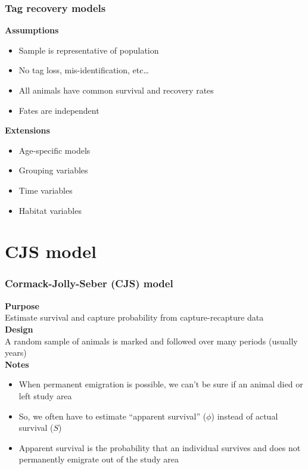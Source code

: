 \documentclass[color=usenames,dvipsnames]{beamer}\usepackage[]{graphicx}\usepackage[]{color}
\begin{document}
\begin{frame}
  \frametitle{Tag recovery models}
  \large
  {\bf Assumptions}
  \begin{itemize}
    \item Sample is representative of population
    \item No tag loss, mis-identification, etc\dots
    \item All animals have common survival and recovery rates
    \item Fates are independent
  \end{itemize}
  \pause
  \vspace{0.5cm}
  {\bf Extensions}
  \begin{itemize}
    \item Age-specific models
    \item Grouping variables
    \item Time variables
    \item Habitat variables
  \end{itemize}
\end{frame}




\section{CJS model}

\begin{frame}
  \frametitle{Cormack-Jolly-Seber (CJS) model}
  {\bf Purpose} \\
  Estimate survival and capture probability from capture-recapture data \\
  \pause
  \vspace{0.5cm}
  {\bf Design} \\
  A random sample of animals is marked and followed over many periods
  (usually years) \\
  \pause
  \vspace{0.5cm}
  {\bf Notes} \\
  \begin{itemize}[<+->]
    \item When permanent emigration is possible, we can't be sure if
    an animal died or left study area
    \item So, we often have to estimate ``apparent survival'' ($\phi$)
      instead of actual survival ($S$)
    \item Apparent survival is the probability that an individual
      survives and does not permanently emigrate out of the study area
  \end{itemize}
\end{frame}
\end{document}
